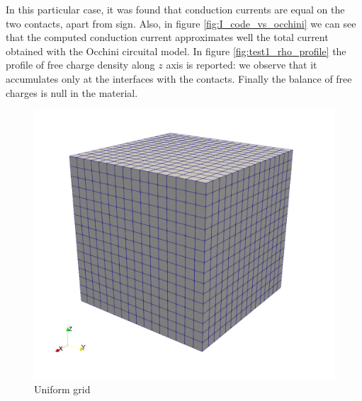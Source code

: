 \documentclass[11pt,a4paper]{article}
\begin{document}
In this particular case, it was found that conduction currents are equal on the two contacts, apart from sign. Also, in figure \ref{fig:I_code_vs_occhini} we can see that the computed conduction current approximates well the total current obtained with the Occhini circuital model. In figure \ref{fig:test1_rho_profile} the profile of free charge density along \(z\) axis is reported: we observe that it accumulates only at the interfaces with the contacts. Finally the balance of free charges is null in the material.
\begin{figure}
	\centering
	\begin{minipage}{0.5\textwidth}
		\includegraphics[width=\textwidth]{pictures/uniform-grid.png}
	\end{minipage}
	\begin{minipage}[t]{0.4\textwidth}
		\caption{Uniform grid}
		\label{fig:unif-grid}
	\end{minipage}
	\label{fig:geom-homog}
\end{figure}
\end{document}
